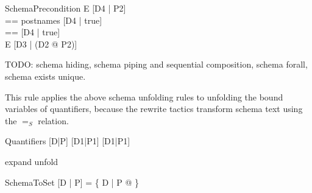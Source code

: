 \documentclass{article}
\newcommand{\sexprUnfoldsTo}{\mathrel{=_{se}}}
\newcommand{\schemaEquals}{\mathrel{=_S}}
\begin{document}
\begin{zedrule}{SchemaPrecondition}
  E \sexprUnfoldsTo [D4 | P2] \\
  \proviso [D2 | true] == postnames [D4 | true] \\
  \proviso [D3 | true] == [D4 | true] \schemaminus [D2 | true] \\
\derives
  \pre E \sexprUnfoldsTo [D3 | (\exists D2 @ P2)]
\end{zedrule}

TODO: schema hiding, schema piping and sequential composition,
schema forall, schema exists unique.

This rule applies the above schema unfolding rules to unfolding
the bound variables of quantifiers, because the rewrite tactics
transform schema text using the $\schemaEquals$ relation.
\begin{zedrule}{Quantifiers}
   [D|P] \sexprUnfoldsTo [D1|P1]
\derives
   [D|P] \schemaEquals [D1|P1]
\end{zedrule}

\begin{zsection}
  \SECTION expand \parents unfold
\end{zsection}

\begin{zedrule}{SchemaToSet}
[D | P] = \{ D | P @ \theta [D | true] \}
\end{zedrule}
\end{document}
